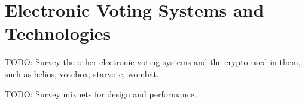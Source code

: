 \chapter{Electronic Voting Systems and Technologies}

TODO: Survey the other electronic voting systems and the crypto used in them, such as helios, votebox, starvote, wombat.

TODO: Survey mixnets for design and performance.
